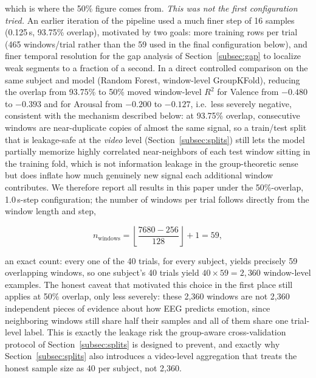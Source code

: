 \documentclass[conference]{IEEEtran}
\begin{document}
\noindent which is where the 50\% figure comes from. \emph{This was not
the first configuration tried.} An earlier iteration of the pipeline used
a much finer step of 16 samples (0.125\,s, 93.75\% overlap), motivated by
two goals: more training rows per trial (465 windows/trial rather than the
59 used in the final configuration below), and finer temporal resolution
for the gap analysis of Section~\ref{subsec:gap} to localize weak segments
to a fraction of a second. In a direct controlled comparison on the same
subject and model (Random Forest, window-level GroupKFold), reducing the
overlap from 93.75\% to 50\% moved window-level $R^2$ for Valence from
$-0.480$ to $-0.393$ and for Arousal from $-0.200$ to $-0.127$, i.e.\ less
severely negative, consistent with the mechanism described below: at
93.75\% overlap, consecutive windows are near-duplicate copies of almost
the same signal, so a train/test split that is leakage-safe at the
\emph{video} level (Section~\ref{subsec:splits}) still lets the model
partially memorize highly correlated near-neighbors of each test window
sitting in the training fold, which is not information leakage in the
group-theoretic sense but does inflate how much genuinely new signal each
additional window contributes. We therefore report all results in this
paper under the 50\%-overlap, 1.0\,s-step configuration; the number of
windows per trial follows directly from the window length and step,

\begin{equation}
n_{\text{windows}} = \left\lfloor \frac{7680 - 256}{128} \right\rfloor + 1 = 59,
\label{eq:nwindows}
\end{equation}

\noindent an exact count: every one of the 40 trials, for every subject,
yields precisely 59 overlapping windows, so one subject's 40 trials yield
$40 \times 59 = 2{,}360$ window-level examples. The honest caveat that
motivated this choice in the first place still applies at 50\% overlap,
only less severely: these 2,360 windows are not 2,360 independent pieces
of evidence about how EEG predicts emotion, since neighboring windows
still share half their samples and all of them share one trial-level
label. This is exactly the leakage risk the group-aware cross-validation
protocol of Section~\ref{subsec:splits} is designed to prevent, and
exactly why Section~\ref{subsec:splits} also introduces a video-level
aggregation that treats the honest sample size as 40 per subject, not
2,360.
\end{document}
